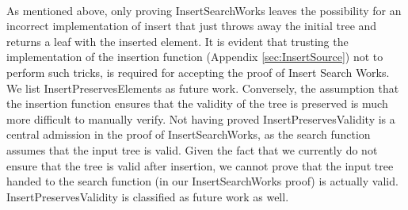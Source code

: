\paragraph{}
As mentioned above, only proving InsertSearchWorks leaves the possibility for an incorrect implementation of insert that just throws away the initial tree and returns a leaf with the inserted element. It is evident that trusting the implementation of the insertion function (Appendix \ref{sec:InsertSource}) not to perform such tricks, is required for accepting the proof of Insert Search Works. We list InsertPreservesElements as future work. Conversely, the assumption that the insertion function ensures that the validity of the tree is preserved is much more difficult to manually verify. Not having proved InsertPreservesValidity is a central admission in the proof of InsertSearchWorks, as the search function assumes that the input tree is valid. Given the fact that we currently do not ensure that the tree is valid after insertion, we cannot prove that the input tree handed to the search function (in our InsertSearchWorks proof) is actually valid. InsertPreservesValidity is classified as future work as well.
